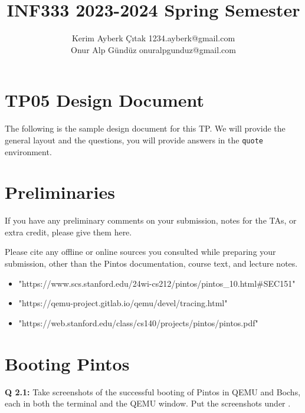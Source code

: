 \documentclass[a4paper,11pt]{paper}
\title{INF333 2023-2024 Spring Semester}
\author{Kerim Ayberk Çıtak 1234.ayberk@gmail.com
\\ Onur Alp Gündüz onuralpgunduz@gmail.com}
\begin{document}
\maketitle

\section*{\LARGE TP05 Design Document}

The following is the sample design document for this TP. We will provide the general layout and the questions, you will provide answers in the \texttt{quote} environment.


\section{Preliminaries}

If you have any preliminary comments on your submission, notes for the TAs, or extra credit, please give them here.

Please cite any offline or online sources you consulted while preparing your
submission, other than the Pintos documentation, course text, and lecture notes.
\begin{itemize}
    \item "https://www.scs.stanford.edu/24wi-cs212/pintos/pintos\_10.html#SEC151"
    \item "https://qemu-project.gitlab.io/qemu/devel/tracing.html"
    \item "https://web.stanford.edu/class/cs140/projects/pintos/pintos.pdf"
\end{itemize}


\section{Booting Pintos}


\textbf{Q 2.1:} Take screenshots of the successful booting of Pintos in QEMU and Bochs, each in
both the terminal and the QEMU window. Put the screenshots under
.
\end{document}
